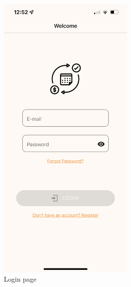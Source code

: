 \documentclass[11pt]{article}
\begin{document}
\begin{figure}[h!]
    \centering
    \begin{minipage}[c]{0.45\textwidth}
        \centering
        \includegraphics[width=0.6\textwidth, clip]{../../assets/smartphone/login.PNG}
        \caption{Login page}
        \label{fig:login}
    \end{minipage}\hspace{1cm}%
    \begin{minipage}[c]{0.45\textwidth}
        \centering

\end{minipage}
\end{figure}
\end{document}
